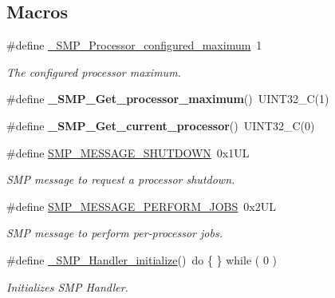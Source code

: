 \subsection*{Macros}
\begin{DoxyCompactItemize}
\item 
\#define \mbox{\hyperlink{group__RTEMSScoreSMP_gacb6a362fb4304b485d32c789869bc646}{\+\_\+\+S\+M\+P\+\_\+\+Processor\+\_\+configured\+\_\+maximum}}~1
\begin{DoxyCompactList}\small\item\em The configured processor maximum. \end{DoxyCompactList}\item 
\mbox{\label{group__RTEMSScoreSMP_ga1148a3f67827c151af4ecfd1ac5acf79}} 
\#define {\bfseries \+\_\+\+S\+M\+P\+\_\+\+Get\+\_\+processor\+\_\+maximum}()~U\+I\+N\+T32\+\_\+C(1)
\item 
\mbox{\label{group__RTEMSScoreSMP_ga2d8627d676df312dfd39bcd2a1aabff8}} 
\#define {\bfseries \+\_\+\+S\+M\+P\+\_\+\+Get\+\_\+current\+\_\+processor}()~U\+I\+N\+T32\+\_\+C(0)
\item 
\#define \mbox{\hyperlink{group__RTEMSScoreSMP_gac58e85513a34442e60a845f78ae436cc}{S\+M\+P\+\_\+\+M\+E\+S\+S\+A\+G\+E\+\_\+\+S\+H\+U\+T\+D\+O\+WN}}~0x1\+UL
\begin{DoxyCompactList}\small\item\em S\+MP message to request a processor shutdown. \end{DoxyCompactList}\item 
\#define \mbox{\hyperlink{group__RTEMSScoreSMP_gac0625ecf5b4d6c951b76f2a5fe6612d1}{S\+M\+P\+\_\+\+M\+E\+S\+S\+A\+G\+E\+\_\+\+P\+E\+R\+F\+O\+R\+M\+\_\+\+J\+O\+BS}}~0x2\+UL
\begin{DoxyCompactList}\small\item\em S\+MP message to perform per-\/processor jobs. \end{DoxyCompactList}\item 
\#define \mbox{\hyperlink{group__RTEMSScoreSMP_ga4a125e6d06b0908b094ff7d67bea5f8e}{\+\_\+\+S\+M\+P\+\_\+\+Handler\+\_\+initialize}}()~do \{ \} while ( 0 )
\begin{DoxyCompactList}\small\item\em Initializes S\+MP Handler. \end{DoxyCompactList}\item 
\mbox{\label{group__RTEMSScoreSMP_gaa0a1136be260412ba8b58ba390688d8a}} 

\end{DoxyCompactItemize}
